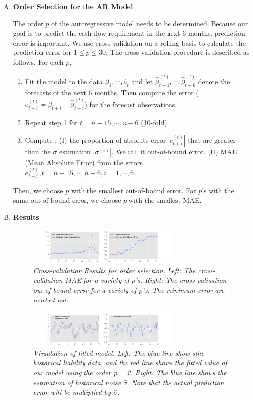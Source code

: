 \begin{enumerate}[A)]
\item\textbf{Order Selection for the AR Model}

    The order $p$ of the autoregressive model needs to be determined. Because our goal is to predict the cash flow requirement in the next 6 months, prediction error is important. We use cross-validation on a rolling basis to calculate the prediction error for $1\leq p\leq 30$. The cross-validation procedure is described as follows.\cite{cvTs} For each $p$, 
    \begin{enumerate}
    	\item Fit the model to the data $\beta_1,\cdots,\beta_t$ and let $\hat{\beta}^{(t)}_{t+1},\cdots,\hat{\beta}^{(t)}_{t+6}$ denote the forecasts of the next 6 months. Then compute the error ($e^{(t)}_{t+i} = \beta_{t+i}- \hat{\beta}^{(t)}_{t+i}$) for the forecast observations. 
        \item Repeat step 1 for $t=n-15,\cdots,n-6$ (10-fold). 
        \item Compute : (I) the proportion of absolute error $|e^{(t)}_{t+i}|$ that are greater than the $\sigma$ estimation $|\sigma^{(t)}|$. We call it out-of-bound error.
        (II) MAE (Mean Absolute Error) from the errors $e^{(t)}_{t+i}, t=n-15,\cdots,n-6,i=1,\cdots,6$. 
    \end{enumerate}
    Then, we choose $p$ with the smallest out-of-bound error. For $p$'s with the same out-of-bound error, we choose $p$ with the smallest MAE.

\item\textbf{Results}

     \begin{figure}
        \centering
        \includegraphics[width=0.7\textwidth]{cv.png}
        \caption{\emph{Cross-validation Results for order selection. Left: The cross-validation MAE for a variety of $p$'s. Right: The cross-validation out-of-bound error for a variety of $p$'s. The minimum error are marked red.}}
        \label{fig:cv_result}
    \end{figure} 

    \begin{figure}
        \centering
        \includegraphics[width=0.7\textwidth]{uncertaintyModel.png}
        \caption{\emph{Visualation of fitted model. Left: The blue line show sthe historical liability data, and the red line shows the fitted value of our model using the order p = 2. Right: The blue line shows the estimation of historical noise $\hat{\sigma}$. Note that the actual prediction error will be multiplied by $\hat{\sigma}$.}}
        \label{fig:uncertaintyModel}
    \end{figure} 


\end{enumerate}

